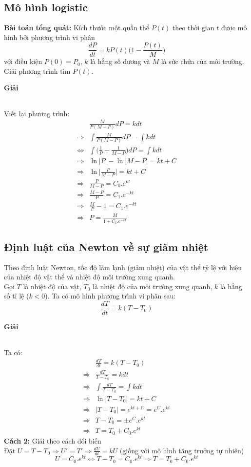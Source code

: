 \documentclass[13pt]{article}
\begin{document}
\subsection{Mô hình logistic}
\textbf{Bài toán tổng quát:} Kích thước một quần thể $P(t)$ theo thời gian $t$ được mô hình bởi phương trình vi phân $$\frac{dP}{dt}=kP(t)\bigg(1-\frac{P(t)}{M}\bigg)$$với điều kiện $P(0)=P_0$, $k$ là hằng số dương và $M$ là sức chứa của môi trường. Giải phương trình tìm $P(t)$.\\
\centerline{\textbf{Giải}}\\
Viết lại phương trình: \begin{align*}
    &\frac{M}{P(M-P)}dP=kdt\\
    \Rightarrow &\int\frac{M}{P(M-P)}dP=\int kdt\\
    \Leftrightarrow &\int\bigg(\frac{1}{P}+\frac{1}{M-P}\bigg)dP=\int kdt\\
    \Rightarrow &\ln|P|-\ln|M-P|=kt+C\\
    \Rightarrow &\ln\bigg|\frac{P}{M-P}\bigg|=kt+C\\
    \Rightarrow &\frac{P}{M-P}=C_0.e^{kt}\\
    \Rightarrow &\frac{M-P}{P}=C_1.e^{-kt}\\
    \Rightarrow &\frac{M}{P}-1=C_1.e^{-kt}\\
    \Rightarrow &P=\frac{M}{1+C_1.e^{-kt}}
\end{align*}
\subsection{Định luật của Newton về sự giảm nhiệt}
Theo định luật Newton, tốc độ làm lạnh (giảm nhiệt) của vật thể tỷ lệ với hiệu của nhiệt độ vật thể và nhiệt độ môi trường xung quanh.\\
Gọi $T$ là nhiệt độ của vật, $T_0$ là nhiệt độ của môi trường xung quanh, $k$ là hằng số tỉ lệ ($k<0$). Ta có mô hình phương trình vi phân sau: $$\frac{dT}{dt}=k(T-T_0)$$
\centerline{\textbf{Giải}}\\
Ta có: \begin{align*}
&\frac{dT}{dt}=k(T-T_0)\\
\Rightarrow &\frac{dT}{T-T_0}=kdt\\
\Rightarrow &\int\frac{dT}{T-T_0}=\int kdt\\
\Rightarrow &\ln|T-T_0|=kt+C\\
\Rightarrow &|T-T_0|=e^{kt+C}=e^C.e^{kt}\\
\Rightarrow &T-T_0=\pm e^C.e^{kt}\\
\Rightarrow &T=T_0+C_0.e^{kt}
\end{align*}
\textbf{Cách 2:} Giải theo cách đổi biến\\
Đặt $U=T-T_0\Rightarrow U'=T'\Rightarrow \frac{dU}{dt}=kU$ (giống với mô hình tăng trưởng tự nhiên)\\
$$U=C_0.e^{kt}\Leftrightarrow T-T_0=C_0.e^{kt}\Rightarrow T=T_0+C_0.e^{kt}$$
\end{document}
